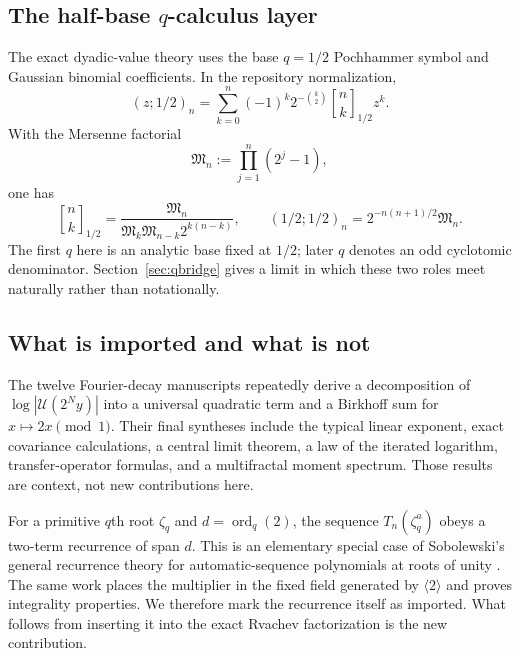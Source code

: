 \documentclass[11pt,oneside]{article}
\theoremstyle{definition}
\theoremstyle{remark}
\newcommand{\ord}{\operatorname{ord}}
\newcommand{\qbinom}[3]{\genfrac{[}{]}{0pt}{}{#1}{#2}_{#3}}
\begin{document}
\subsection{The half-base $q$-calculus layer}

The exact dyadic-value theory uses the base $q=1/2$ Pochhammer symbol and Gaussian
binomial coefficients. In the repository normalization,
\begin{equation}
 (z;1/2)_n=\sum_{k=0}^n(-1)^k2^{-\binom{k}{2}}
 \qbinom{n}{k}{1/2}z^k.
 \label{eq:qbinom-expansion}
\end{equation}
With the Mersenne factorial
\begin{equation}
 \mathfrak M_n:=\prod_{j=1}^n(2^j-1),
 \label{eq:Mersenne-factorial}
\end{equation}
one has
\begin{equation}
 \qbinom{n}{k}{1/2}
 =\frac{\mathfrak M_n}{\mathfrak M_k\mathfrak M_{n-k}2^{k(n-k)}},
 \qquad
 (1/2;1/2)_n=2^{-n(n+1)/2}\mathfrak M_n.
 \label{eq:Mersenne-qbinom}
\end{equation}
The first $q$ here is an analytic base fixed at $1/2$; later $q$ denotes an odd
cyclotomic denominator. Section~\ref{sec:qbridge} gives a limit in which these two
roles meet naturally rather than notationally.

\subsection{What is imported and what is not}

The twelve Fourier-decay manuscripts repeatedly derive a decomposition of
$\log|\mathscr U(2^Ny)|$ into a universal quadratic term and a Birkhoff sum for
$x\mapsto2x\pmod1$. Their final syntheses include the typical linear exponent,
exact covariance calculations, a central limit theorem, a law of the iterated
logarithm, transfer-operator formulas, and a multifractal moment spectrum. Those
results are context, not new contributions here.

For a primitive $q$th root $\zeta_q$ and $d=\ord_q(2)$, the sequence
$T_n(\zeta_q^a)$ obeys a two-term recurrence of span $d$. This is an elementary
special case of Sobolewski's general recurrence theory for automatic-sequence
polynomials at roots of unity \cite{sobolewski2019}. The same work places the
multiplier in the fixed field generated by $\langle2\rangle$ and proves integrality
properties. We therefore mark the recurrence itself as imported. What follows from
inserting it into the exact Rvachev factorization is the new contribution.
\end{document}
